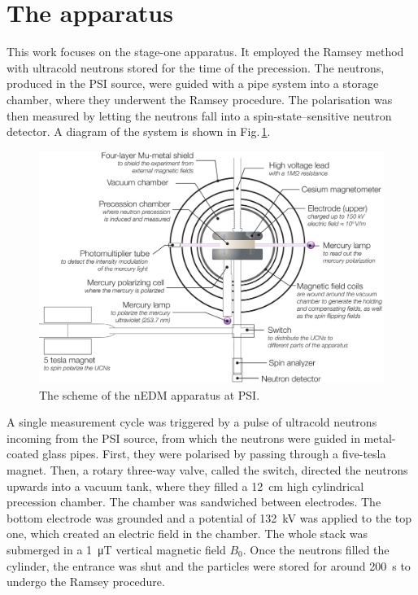 \section{The apparatus}
This work focuses on the stage-one apparatus.
It employed the Ramsey method with ultracold neutrons stored for the time of the precession.
The neutrons, produced in the PSI source, were guided with a pipe system into a storage chamber, where they underwent the Ramsey procedure.
The polarisation was then measured by letting the neutrons fall into a spin-state--sensitive neutron detector.
A diagram of the system is shown in Fig.\,\ref{fig:nEDM_scheme}.

\begin{figure}
  \centering
  \includegraphics[width=\linewidth]{gfx/nEDMatPSI/apparatus-cartoon-main-and-sub-labels.pdf}
  \caption{The scheme of the nEDM apparatus at PSI\@.  }\label{fig:nEDM_scheme}
\end{figure}

A single measurement cycle was triggered by a pulse of ultracold neutrons incoming from the PSI source, from which the neutrons were guided in metal-coated glass pipes.
First, they were polarised by passing through a five-tesla magnet.
Then, a rotary three-way valve, called the switch, directed the neutrons upwards into a vacuum tank, where they filled a \SI{12}{\centi\meter} high cylindrical precession chamber.
The chamber was sandwiched between electrodes. The bottom electrode was grounded and a potential of \SI{132}{\kilo\volt} was applied to the top one, which created an electric field in the chamber.
The whole stack was submerged in a \SI{1}{\micro\tesla} vertical magnetic field $B_0$.
Once the neutrons filled the cylinder, the entrance was shut and the particles were stored for around \SI{200}{\second} to undergo the Ramsey procedure.

